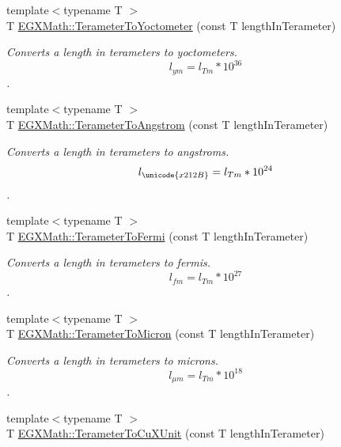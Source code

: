 \begin{DoxyCompactItemize}
{\footnotesize template$<$typename T $>$ }\\T \mbox{\hyperlink{group___e_g_x_math-_conversions-_length_conversions-_s_i-_terameter-_s_i_ga8cdb09d983691434d45c52808465c92f}{E\+G\+X\+Math\+::\+Terameter\+To\+Yoctometer}} (const T length\+In\+Terameter)
\begin{DoxyCompactList}\small\item\em Converts a length in terameters to yoctometers. \[ l_{ym}=l_{Tm} * 10^{36} \]. \end{DoxyCompactList}\item 
{\footnotesize template$<$typename T $>$ }\\T \mbox{\hyperlink{group___e_g_x_math-_conversions-_length_conversions-_s_i-_terameter-_non-_s_i_gaab75399e224bea4ea7ddb8bf5f557ee0}{E\+G\+X\+Math\+::\+Terameter\+To\+Angstrom}} (const T length\+In\+Terameter)
\begin{DoxyCompactList}\small\item\em Converts a length in terameters to angstroms. \[ l_{\unicode{x212B}}=l_{Tm} * 10^{24} \]. \end{DoxyCompactList}\item 
{\footnotesize template$<$typename T $>$ }\\T \mbox{\hyperlink{group___e_g_x_math-_conversions-_length_conversions-_s_i-_terameter-_non-_s_i_ga5bf639553e4b6e8520f9345def06e492}{E\+G\+X\+Math\+::\+Terameter\+To\+Fermi}} (const T length\+In\+Terameter)
\begin{DoxyCompactList}\small\item\em Converts a length in terameters to fermis. \[ l_{fm}=l_{Tm} * 10^{27} \]. \end{DoxyCompactList}\item 
{\footnotesize template$<$typename T $>$ }\\T \mbox{\hyperlink{group___e_g_x_math-_conversions-_length_conversions-_s_i-_terameter-_non-_s_i_gaa5fdc4aaf15e6428cf443e3d808403a3}{E\+G\+X\+Math\+::\+Terameter\+To\+Micron}} (const T length\+In\+Terameter)
\begin{DoxyCompactList}\small\item\em Converts a length in terameters to microns. \[ l_{\mu m}=l_{Tm} * 10^{18} \]. \end{DoxyCompactList}\item 
{\footnotesize template$<$typename T $>$ }\\T \mbox{\hyperlink{group___e_g_x_math-_conversions-_length_conversions-_s_i-_terameter-_non-_s_i_ga5eab9d29867c570350691cca342c9472}{E\+G\+X\+Math\+::\+Terameter\+To\+Cu\+X\+Unit}} (const T length\+In\+Terameter)

\end{DoxyCompactItemize}
